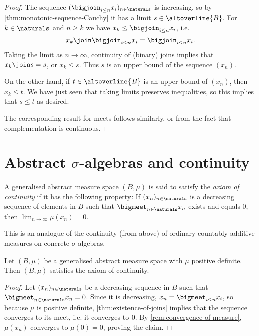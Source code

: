 \documentclass[article, a4paper, 11pt, oneside]{memoir}
\numberwithin{equation}{chapter}
\begin{document}
\begin{proof}
    The sequence $( \bigjoin_{i \leq n} x_i )_{n\in\naturals}$ is increasing, so by \cref{thm:monotonic-sequence-Cauchy} it has a limit $s \in \altoverline{B}$. For $k \in \naturals$ and $n \geq k$ we have $x_k \leq \bigjoin_{i \leq n} x_i$, i.e.
    \begin{equation*}
        x_k \join \bigjoin_{i \leq n} x_i
            = \bigjoin_{i \leq n} x_i.
    \end{equation*}
    Taking the limit as $n \to \infty$, continuity of (binary) joins implies that $x_k \join s = s$, or $x_k \leq s$. Thus $s$ is an upper bound of the sequence $(x_n)$.

    On the other hand, if $t \in \altoverline{B}$ is an upper bound of $(x_n)$, then $x_k \leq t$. We have just seen that taking limits preserves inequalities, so this implies that $s \leq t$ as desired.

    The corresponding result for meets follows similarly, or from the fact that complementation is continuous.
\end{proof}


\section[Abstract sigma-algebras and continuity][Abstract $\sigma$-algebras and continuity]{Abstract $\sigma$-algebras and continuity}

\begin{definition}
    A generalised abstract measure space $(B, \mu)$ is said to satisfy the \emph{axiom of continuity} if it has the following property: If $(x_n)_{n\in\naturals}$ is a decreasing sequence of elements in $B$ such that $\bigmeet_{n\in\naturals} x_n$ exists and equals $0$, then $\lim_{n\to\infty} \mu(x_n) = 0$.
\end{definition}
%
This is an analogue of the continuity (from above) of ordinary countably additive measures on concrete $\sigma$-algebras.


\begin{lemma}
    \label{thm:positive-definite-implies-continuous}
    Let $(B, \mu)$ be a generalised abstract measure space with $\mu$ positive definite. Then $(B,\mu)$ satisfies the axiom of continuity.
\end{lemma}

\begin{proof}
    Let $(x_n)_{n\in\naturals}$ be a decreasing sequence in $B$ such that $\bigmeet_{n\in\naturals} x_n = 0$. Since it is decreasing, $x_n = \bigmeet_{i \leq n} x_i$, so because $\mu$ is positive definite, \cref{thm:existence-of-joins} implies that the sequence converges to its meet, i.e. it converges to $0$. By \cref{rem:convergence-of-measure}, $\mu(x_n)$ converges to $\mu(0) = 0$, proving the claim.
\end{proof}
\end{document}
